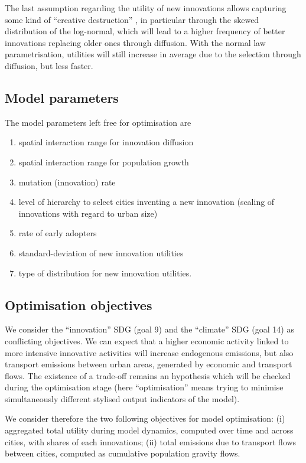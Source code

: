 \documentclass[final,5p,times,twocolumn,authoryear]{elsarticle}
\begin{document}
The last assumption regarding the utility of new innovations allows capturing some kind of ``creative destruction'' \citep{diamond2006schumpeter}, in particular through the skewed distribution of the log-normal, which will lead to a higher frequency of better innovations replacing older ones through diffusion. With the normal law parametrisation, utilities will still increase in average due to the selection through diffusion, but less faster.


\subsection{Model parameters}

The model parameters left free for optimisation are
\begin{enumerate}
    \item spatial interaction range for innovation diffusion
    \item spatial interaction range for population growth
    \item mutation (innovation) rate
    \item level of hierarchy to select cities inventing a new innovation (scaling of innovations with regard to urban size)
    \item rate of early adopters
    \item standard-deviation of new innovation utilities
    \item type of distribution for new innovation utilities.
\end{enumerate}


\subsection{Optimisation objectives}

We consider the ``innovation'' SDG (goal 9) and the ``climate'' SDG (goal 14) as conflicting objectives. We can expect that a higher economic activity linked to more intensive innovative activities will increase endogenous emissions, but also transport emissions between urban areas, generated by economic and transport flows. The existence of a trade-off remains an hypothesis which will be checked during the optimisation stage (here ``optimisation'' means trying to minimise simultaneously different stylised output indicators of the model).

\cite{chen2020does}

We consider therefore the two following objectives for model optimisation: (i) aggregated total utility during model dynamics, computed over time and across cities, with shares of each innovations; (ii) total emissions due to transport flows between cities, computed as cumulative population gravity flows.
\end{document}
